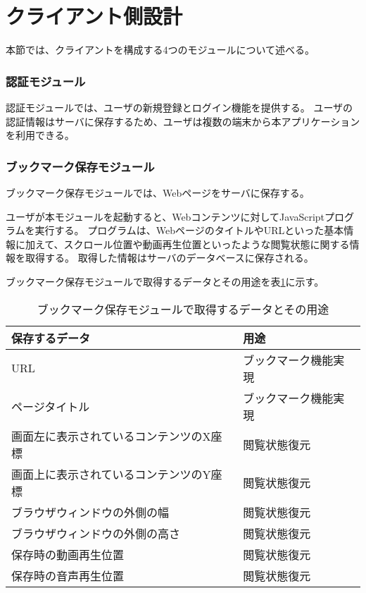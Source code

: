 \section{クライアント側設計}
本節では、クライアントを構成する4つのモジュールについて述べる。

\subsubsection{認証モジュール}
認証モジュールでは、ユーザの新規登録とログイン機能を提供する。
ユーザの認証情報はサーバに保存するため、ユーザは複数の端末から本アプリケーションを利用できる。

\subsubsection{ブックマーク保存モジュール}
ブックマーク保存モジュールでは、Webページをサーバに保存する。

ユーザが本モジュールを起動すると、Webコンテンツに対してJavaScriptプログラムを実行する。
プログラムは、WebページのタイトルやURLといった基本情報に加えて、スクロール位置や動画再生位置といったような閲覧状態に関する情報を取得する。
取得した情報はサーバのデータベースに保存される。

ブックマーク保存モジュールで取得するデータとその用途を表\ref{tb:design-save-bookmark-data-usage}に示す。

\begin{table}[htbp]
  \label{tb:design-save-bookmark-data-usage}
  \caption{ブックマーク保存モジュールで取得するデータとその用途}
  \begin{center}
    \begin{tabular}{|l|l|}
      \hline
      保存するデータ & 用途 \\\hline\hline
      URL & ブックマーク機能実現 \\\hline
      ページタイトル & ブックマーク機能実現 \\\hline
      画面左に表示されているコンテンツのX座標 & 閲覧状態復元 \\\hline
      画面上に表示されているコンテンツのY座標 & 閲覧状態復元 \\\hline
      ブラウザウィンドウの外側の幅 & 閲覧状態復元 \\\hline
      ブラウザウィンドウの外側の高さ & 閲覧状態復元 \\\hline
      保存時の動画再生位置 & 閲覧状態復元 \\\hline
      保存時の音声再生位置 & 閲覧状態復元 \\\hline
    \end{tabular}
  \end{center}
\end{table}

